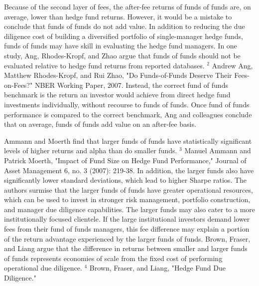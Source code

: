 \documentclass[11pt]{article}
\begin{document}
Because of the second layer of fees, the after-fee returns of funds of funds are, on average, lower than hedge fund returns. However, it would be a mistake to conclude that funds of funds do not add value. In addition to reducing the due diligence cost of building a diversified portfolio of single-manager hedge funds, funds of funds may have skill in evaluating the hedge fund managers. In one study, Ang, Rhodes-Kropf, and Zhao argue that funds of funds should not be evaluated relative to hedge fund returns from reported databases. ${ }^{2}$ Andrew Ang, Matthew Rhodes-Kropf, and Rui Zhao, "Do Funds-of-Funds Deserve Their Fees-on-Fees?" NBER Working Paper, 2007. Instead, the correct fund of funds benchmark is the return an investor would achieve from direct hedge fund investments individually, without recourse to funds of funds. Once fund of funds performance is compared to the correct benchmark, Ang and colleagues conclude that on average, funds of funds add value on an after-fee basis.

Ammann and Moerth find that larger funds of funds have statistically significant levels of higher returns and alpha than do smaller funds. ${ }^{3}$ Manuel Ammann and Patrick Moerth, "Impact of Fund Size on Hedge Fund Performance," Journal of Asset Management 6, no. 3 (2007): 219-38. In addition, the larger funds also have significantly lower standard deviations, which lead to higher Sharpe ratios. The authors surmise that the larger funds of funds have greater operational resources, which can be used to invest in stronger risk management, portfolio construction, and manager due diligence capabilities. The larger funds may also cater to a more institutionally focused clientele. If the large institutional investors demand lower fees from their fund of funds managers, this fee difference may explain a portion of the return advantage experienced by the larger funds of funds. Brown, Fraser, and Liang argue that the difference in returns between smaller and larger funds of funds represents economies of scale from the fixed cost of performing operational due diligence. ${ }^{4}$ Brown, Fraser, and Liang, "Hedge Fund Due Diligence."
\end{document}
